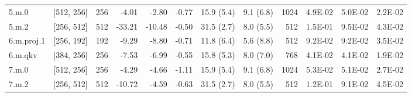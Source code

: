 \begin{table}
\begin{tabular}{llrrrrllrrrr}
5.m.0 & [512, 256] & 256 & {\cellcolor[HTML]{F5FBB2}} \color[HTML]{000000} -4.01 & {\cellcolor[HTML]{F1F9AC}} \color[HTML]{000000} -2.80 & {\cellcolor[HTML]{ECF7A6}} \color[HTML]{000000} -0.77 & 15.9 (5.4) & 9.1 (6.8) & 1024 & {\cellcolor[HTML]{F5FBB2}} \color[HTML]{000000} 4.9E-02 & {\cellcolor[HTML]{F8FCB6}} \color[HTML]{000000} 5.0E-02 & {\cellcolor[HTML]{D3EC87}} \color[HTML]{000000} 2.2E-02 \\
5.m.2 & [256, 512] & 512 & {\cellcolor[HTML]{FDB567}} \color[HTML]{000000} -33.21 & {\cellcolor[HTML]{FFF8B4}} \color[HTML]{000000} -10.48 & {\cellcolor[HTML]{EBF7A3}} \color[HTML]{000000} -0.50 & 31.5 (2.7) & 8.0 (5.5) & 512 & {\cellcolor[HTML]{EB5A3A}} \color[HTML]{F1F1F1} 1.5E-01 & {\cellcolor[HTML]{FECE7C}} \color[HTML]{000000} 9.5E-02 & {\cellcolor[HTML]{EEF8A8}} \color[HTML]{000000} 4.3E-02 \\
6.m.proj.1 & [256, 192] & 192 & {\cellcolor[HTML]{FFFCBA}} \color[HTML]{000000} -9.29 & {\cellcolor[HTML]{FFFDBC}} \color[HTML]{000000} -8.80 & {\cellcolor[HTML]{EBF7A3}} \color[HTML]{000000} -0.71 & 11.8 (6.4) & 5.6 (8.8) & 512 & {\cellcolor[HTML]{FED27F}} \color[HTML]{000000} 9.2E-02 & {\cellcolor[HTML]{FED481}} \color[HTML]{000000} 9.2E-02 & {\cellcolor[HTML]{E5F49B}} \color[HTML]{000000} 3.5E-02 \\
6.m.qkv & [384, 256] & 256 & {\cellcolor[HTML]{FEFFBE}} \color[HTML]{000000} -7.53 & {\cellcolor[HTML]{FDFEBC}} \color[HTML]{000000} -6.99 & {\cellcolor[HTML]{EBF7A3}} \color[HTML]{000000} -0.55 & 15.8 (5.3) & 8.0 (7.0) & 768 & {\cellcolor[HTML]{ECF7A6}} \color[HTML]{000000} 4.1E-02 & {\cellcolor[HTML]{ECF7A6}} \color[HTML]{000000} 4.1E-02 & {\cellcolor[HTML]{CBE982}} \color[HTML]{000000} 1.9E-02 \\
7.m.0 & [512, 256] & 256 & {\cellcolor[HTML]{F5FBB2}} \color[HTML]{000000} -4.29 & {\cellcolor[HTML]{F7FCB4}} \color[HTML]{000000} -4.66 & {\cellcolor[HTML]{ECF7A6}} \color[HTML]{000000} -1.11 & 15.9 (5.4) & 9.1 (6.8) & 1024 & {\cellcolor[HTML]{FBFDBA}} \color[HTML]{000000} 5.3E-02 & {\cellcolor[HTML]{FAFDB8}} \color[HTML]{000000} 5.1E-02 & {\cellcolor[HTML]{DAF08D}} \color[HTML]{000000} 2.7E-02 \\
7.m.2 & [256, 512] & 512 & {\cellcolor[HTML]{FFF8B4}} \color[HTML]{000000} -10.72 & {\cellcolor[HTML]{F7FCB4}} \color[HTML]{000000} -4.59 & {\cellcolor[HTML]{EBF7A3}} \color[HTML]{000000} -0.63 & 31.5 (2.7) & 8.0 (5.5) & 512 & {\cellcolor[HTML]{FB9D59}} \color[HTML]{000000} 1.2E-01 & {\cellcolor[HTML]{FED481}} \color[HTML]{000000} 9.1E-02 & {\cellcolor[HTML]{F1F9AC}} \color[HTML]{000000} 4.5E-02 \\

\end{tabular}
\end{table}
